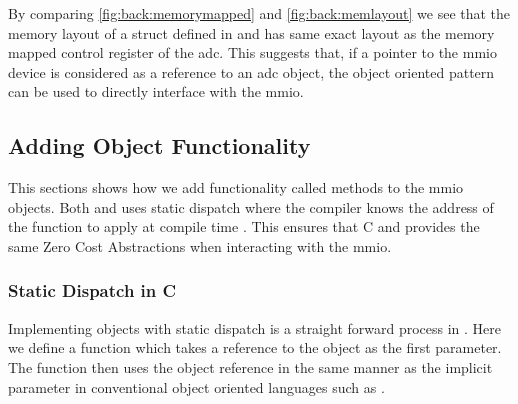 By comparing \autoref{fig:back:memorymapped} and \autoref{fig:back:memlayout} we see that the memory layout of a struct defined in \rust and \C has same exact layout as the memory mapped control register of the \gls{adc}.
This suggests that, if a pointer to the \gls{mmio} device is considered as a reference to an \gls{adc} object, the object oriented pattern can be used to directly interface with the \gls{mmio}.

\subsection{Adding Object Functionality}

This sections shows how we add functionality called methods to the \gls{mmio} objects.
Both \C and \rust uses static dispatch where the compiler knows the address of the function to apply at compile time .
This ensures that C and \rust provides the same Zero Cost Abstractions when interacting with the \gls{mmio}.

\subsubsection{Static Dispatch in C}

Implementing objects with static dispatch is a straight forward process in \C.
Here we define a function which takes a reference to the object as the first parameter.
The function then uses the object reference in the same manner as the implicit  parameter in conventional object oriented languages such as \Java.


